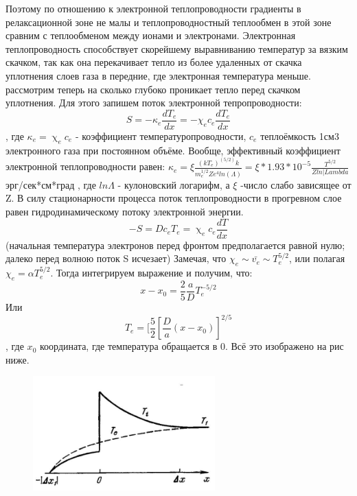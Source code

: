 \documentclass[10pt, a4paper]{article}
\begin{document}
Поэтому по отношению к электронной теплопроводности градиенты в релаксационной зоне не малы и теплопроводностный теплообмен в этой зоне сравним с теплообменом между ионами и электронами. Электронная теплопроводность способствует скорейшему выравниванию температур за вязким скачком, так как она перекачивает тепло из более удаленных от скачка уплотнения слоев газа в передние, где электронная температура меньше. 
рассмотрим теперь на сколько глубоко проникает тепло перед скачком уплотнения.
Для этого запишем поток электронной тепропроводности:
\begin{equation}
	S=-\kappa_e \frac{dT_e}{dx}=-\chi_e c_e \frac{dT_e}{dx}
\end{equation}
, где $\kappa_e = \upchi_e c_e$ - коэффициент температуропроводности, $c_e$ теплоёмкость 1см3 электронного газа при постоянном объёме.
Вообще, эффективный коэффициент электронной теплопроводности равен:
$\kappa_e = \xi \frac{(kT_e)^(5/2) k}{m_e^{1/2} Z e^{4} ln(\Lambda)} = \xi *1.93*10^{-5}\frac{T^{5/2}}{Z ln|Lambda} $ эрг/сек*см*град
, где $ln\Lambda$ - кулоновский логарифм, а $\xi$ -число слабо зависящее от Z.
В силу стационарности процесса поток теплопроводности в прогревном слое равен гидродинамическому потоку электронной энергии.
\begin{equation}
	-S= D c_e T_e = \upchi_e c_e \frac{dT}{dx}
\end{equation}
(начальная температура электронов перед фронтом предполагается равной нулю; далеко перед волною поток S исчезает)
Замечая, что $\chi_e \sim \bar{v_e} \sim T_e^{5/2} $, или полагая $\chi_e=\alpha T_e^{5/2}$. Тогда интегрируем выражение и получим, что:
\begin{equation}
	x-x_0 = \frac{2}{5} \frac{a}{D} T_e^{-5/2}
\end{equation}
Или 
\begin{equation}
	T_e = [\frac{5}{2} [\frac{D}{a} (x-x_0) ]^{2/5}
\end{equation}
, где $x_0$ координата, где температура обращается в 0. Всё это изображено на рис ниже.

\begin{figure}[ht]
	\begin{center}
		\includegraphics[width=70mm]{13. teploprov.JPG}
	\end{center}
\end{figure}
\end{document}
